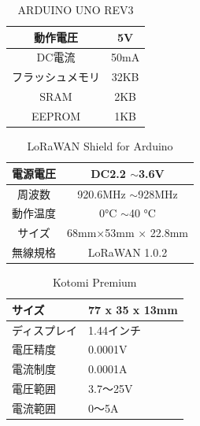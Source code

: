 \begin{table}[]
    \caption{ARDUINO UNO REV3}\label{fig:Arduino_Spec}
    \centering
    \begin{tabular}{|c|c|}
    \hline
    動作電圧     & 5V   \\ \hline
    DC電流     & 50mA \\ \hline
    フラッシュメモリ & 32KB \\ \hline
    SRAM     & 2KB  \\ \hline
    EEPROM   & 1KB  \\ \hline
    \end{tabular}
\end{table}

\begin{table}[]
    \caption{LoRaWAN Shield for Arduino}\label{fig:LoRaWAN_Spec}
    \centering
    \begin{tabular}{|c|c|}
    \hline
    電源電圧 & DC2.2 $\sim$3.6V      \\ \hline
    周波数  & 920.6MHz $\sim$928MHz \\ \hline
    動作温度 & 0°C $\sim$40 °C       \\ \hline
    サイズ  & 68mm×53mm × 22.8mm    \\ \hline
    無線規格 & LoRaWAN 1.0.2         \\ \hline
    \end{tabular}
\end{table}

\begin{table}[]
    \caption{Kotomi Premium}\label{fig:Kotomi_Spec}
    \centering
    \begin{tabular}{|l|l|}
    \hline
    サイズ    & 77 x 35 x 13mm \\ \hline
    ディスプレイ & 1.44インチ        \\ \hline
    電圧精度   & 0.0001V        \\ \hline
    電流制度   & 0.0001A        \\ \hline
    電圧範囲   & 3.7～25V        \\ \hline
    電流範囲   & 0～5A           \\ \hline
    \end{tabular}
\end{table}

